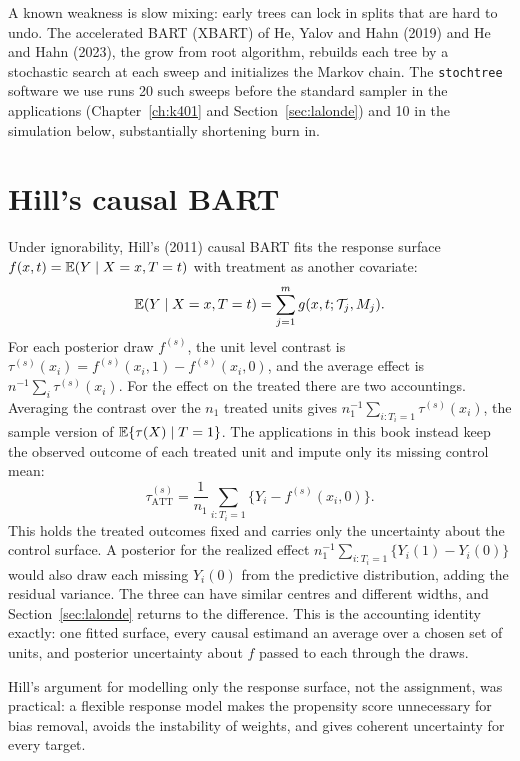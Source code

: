 A known weakness is slow mixing: early trees can lock in splits that are hard to undo. The accelerated BART (XBART) of He, Yalov and Hahn (2019) and He and Hahn (2023), the grow from root algorithm, rebuilds each tree by a stochastic search at each sweep and initializes the Markov chain. The \texttt{stochtree} software we use runs 20 such sweeps before the standard sampler in the applications (Chapter~\ref{ch:k401} and Section~\ref{sec:lalonde}) and 10 in the simulation below, substantially shortening burn in.

\section{Hill's causal BART}

Under ignorability, Hill's (2011) causal BART fits the response surface $f(x, t) = \mathbb{E}(Y \mid X = x, T = t)$ with treatment as another covariate:
\begin{equation}
\mathbb{E}(Y \mid X = x, T = t) = \sum_{j=1}^m g(x, t; \mathcal{T}_j, M_j).
\label{eq:bart:hill}
\end{equation}
For each posterior draw $f^{(s)}$, the unit level contrast is $\tau^{(s)}(x_i) = f^{(s)}(x_i, 1) - f^{(s)}(x_i, 0)$, and the average effect is $n^{-1}\sum_i \tau^{(s)}(x_i)$. For the effect on the treated there are two accountings. Averaging the contrast over the $n_1$ treated units gives $n_1^{-1}\sum_{i: T_i = 1}\tau^{(s)}(x_i)$, the sample version of $\mathbb{E}\{\tau(X) \mid T = 1\}$. The applications in this book instead keep the observed outcome of each treated unit and impute only its missing control mean:
\[
\tau_{\mathrm{ATT}}^{(s)} = \frac{1}{n_1}\sum_{i: T_i = 1}\bigl\{Y_i - f^{(s)}(x_i, 0)\bigr\}.
\]
This holds the treated outcomes fixed and carries only the uncertainty about the control surface. A posterior for the realized effect $n_1^{-1}\sum_{i: T_i = 1}\{Y_i(1) - Y_i(0)\}$ would also draw each missing $Y_i(0)$ from the predictive distribution, adding the residual variance. The three can have similar centres and different widths, and Section~\ref{sec:lalonde} returns to the difference. This is the accounting identity exactly: one fitted surface, every causal estimand an average over a chosen set of units, and posterior uncertainty about $f$ passed to each through the draws.

Hill's argument for modelling only the response surface, not the assignment, was practical: a flexible response model makes the propensity score unnecessary for bias removal, avoids the instability of weights, and gives coherent uncertainty for every target.

